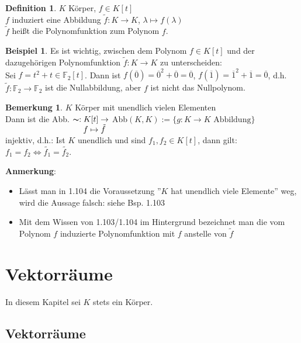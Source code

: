\documentclass[10pt,a4paper,numbers=endperiod]{scrartcl}
\theoremstyle{definition}
\newtheorem{defi}[satz]{Definition}
\newtheorem{bem}[satz]{Bemerkung}
\newtheorem{bsp}[satz]{Beispiel}
\begin{document}
\begin{defi}
	$K$ Körper, $f \in K[t]$\\
	$f$ induziert eine Abbildung $\tilde{f}: K \rightarrow K$, $\lambda \mapsto f(\lambda)$\\
	$\tilde{f}$ heißt die Polynomfunktion zum Polynom $f$.
\end{defi}

\begin{bsp}
	Es ist wichtig, zwischen dem Polynom $f \in K[t]$ und der dazugehörigen Polynomfunktion $\tilde{f}: K \rightarrow K$ zu unterscheiden:\\
	Sei $f = t^2 + t \in \mathbb{F}_2[t]$. Dann ist $f(\overline{0})=\overline{0}^2 + \overline{0} = \overline{0}$, $f(\overline{1})=\overline{1}^2 + \overline{1} = \overline{0}$, d.h. $\tilde{f}: \mathbb{F}_2 \rightarrow \mathbb{F}_2$ ist die Nullabbildung, aber $f$ ist nicht das Nullpolynom.
\end{bsp}

\begin{bem}
	$K$ Körper mit unendlich vielen Elementen\\
	Dann ist die Abb. $\thicksim: K[t] \rightarrow$ Abb$(K,K) := \{g: K \rightarrow K \text{ Abbildung}\}$\\
	$\hspace*{33,5mm} f \mapsto \tilde{f}$\\
	injektiv, d.h.: Ist $K$ unendlich und sind $f_1,f_2 \in K[t]$, dann gilt: $f_1=f_2 \Leftrightarrow \tilde{f_1}=\tilde{f_2}$.
\end{bem}

\textbf{Anmerkung}: \begin{itemize}
	\item Lässt man in 1.104 die Voraussetzung ''$K$ hat unendlich viele Elemente'' weg, wird die Aussage falsch: siehe Bsp. 1.103
	\item Mit dem Wissen von 1.103/1.104 im Hintergrund bezeichnet man die vom Polynom $f$ induzierte Polynomfunktion mit $f$ anstelle von $\tilde{f}$
\end{itemize}

\section{Vektorräume}
In diesem Kapitel sei $K$ stets ein Körper.

\subsection{Vektorräume}
\end{document}
